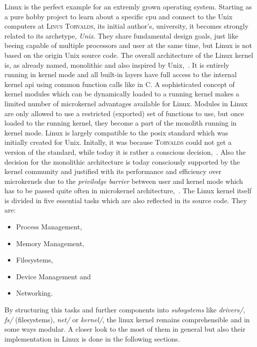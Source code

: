 Linux is the perfect example for an extremly grown operating system.
Starting as a pure hobby project to learn about a specific \ac{cpu} and connect to the Unix computers at \textsc{Linus Torvalds}, its initial author's, university, it becomes strongly related to its archetype, \textit{Unix}\cite{DiamondTorvalds2002}. 
They share fundamental design goals, just like beeing capable of multiple processors and user at the same time, but Linux is not based on the origin Unix source code\cite{tanenbaum-modern-operating-systems}.
The overall architecture of the Linux kernel is, as already named, monolithic and also inspired by Unix\cite{lfd430},~\cite{DiamondTorvalds2002}.
It is entirely running in kernel mode and all built-in layers have full access to the internal kernel \ac{api} using common function calls like in C.
A sophisticated concept of kernel modules which can be dynamically loaded to a running kernel makes a limited number of microkernel advantages available for Linux.
Modules in Linux are only allowed to use a restricted (exported) set of functions to use, but once loaded to the running kernel, they become a part of the monolith running in kernel mode\cite{lfd430}.
Linux is largely compatible to the \ac{posix} standard which was initially created for Unix.
Initally, it was because \textsc{Torvalds} could not get a version of the standard, while today it is rather a conscious decision\cite{DiamondTorvalds2002},~\cite{tanenbaum-modern-operating-systems}. 
Also the decision for the monolithic architecture is today consciously supported by the kernel community and justified with its performance and efficiency over microkernels due to the \textit{priviledge barrier} between user and kernel mode which has to be passed quite often in microkernel architecture\cite{why-linux-monolith},~\cite{lfd430}.
The Linux kernel itself is divided in five essential tasks which are also reflected in its source code.
They are: 
\begin{itemize}
    \item Process Management,
    \item Memory Management,
    \item Filesystems,
    \item Device Management and
    \item Networking\cite{lfd430}.
\end{itemize}
By structuring this tasks and further components into \textit{subsystems} like \textit{drivers/}, \textit{fs/} (filesystems), \textit{net/} or \textit{kernel/}, the linux kernel remains comprehensible and in some ways modular. 
A closer look to the most of them in general but also their implementation in Linux is done in the following sections.

